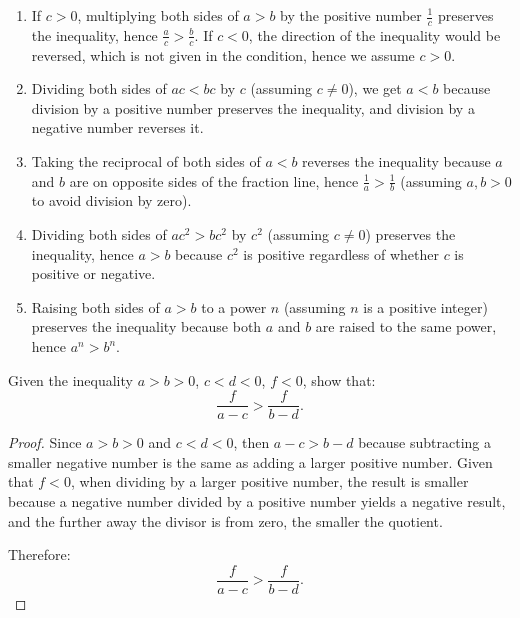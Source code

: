 \documentclass[
	12pt, %
	fleqn, %
	a4paper, %
]{LegrandOrangeBook}
\begin{document}
\begin{enumerate}
    \item If \( c > 0 \), multiplying both sides of \( a > b \) by the positive number \( \frac{1}{c} \) preserves the inequality, hence \( \frac{a}{c} > \frac{b}{c} \). If \( c < 0 \), the direction of the inequality would be reversed, which is not given in the condition, hence we assume \( c > 0 \).
    \item Dividing both sides of \( ac < bc \) by \( c \) (assuming \( c \neq 0 \)), we get \( a < b \) because division by a positive number preserves the inequality, and division by a negative number reverses it.
    \item Taking the reciprocal of both sides of \( a < b \) reverses the inequality because \( a \) and \( b \) are on opposite sides of the fraction line, hence \( \frac{1}{a} > \frac{1}{b} \) (assuming \( a, b > 0 \) to avoid division by zero).
    \item Dividing both sides of \( ac^2 > bc^2 \) by \( c^2 \) (assuming \( c \neq 0 \)) preserves the inequality, hence \( a > b \) because \( c^2 \) is positive regardless of whether \( c \) is positive or negative.
    \item Raising both sides of \( a > b \) to a power \( n \) (assuming \( n \) is a positive integer) preserves the inequality because both \( a \) and \( b \) are raised to the same power, hence \( a^n > b^n \).
\end{enumerate}
\begin{exercise}
    Given the inequality \( a > b > 0 \), \( c < d < 0 \), \( f < 0 \), show that:
\[
\frac{f}{a - c} > \frac{f}{b - d}.
\]
\end{exercise}
\begin{proof}
    Since \( a > b > 0 \) and \( c < d < 0 \), then \( a - c > b - d \) because subtracting a smaller negative number is the same as adding a larger positive number. Given that \( f < 0 \), when dividing by a larger positive number, the result is smaller because a negative number divided by a positive number yields a negative result, and the further away the divisor is from zero, the smaller the quotient.

Therefore:
\[
\frac{f}{a - c} > \frac{f}{b - d}.
\]
\end{proof}
\end{document}

